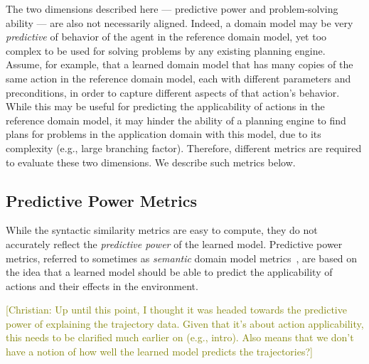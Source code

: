 \documentclass{article}
\theoremstyle{definition}
\theoremstyle{remark}
\newcommand{\roni}[1]{{\textcolor{red}{[Roni: #1]}}}
\newcommand{\cm}[1]{{\textcolor{olive}{[Christian: #1]}}}
\begin{document}
The two dimensions described here --- predictive power and problem-solving ability --- are also not necessarily aligned. Indeed, a domain model may be very \emph{predictive} of behavior of the agent in the reference domain model, yet too complex to be used for solving problems by any existing planning engine.
Assume, for example, that a learned domain model that has many copies of the same action in the reference domain model, each with different parameters and preconditions, in order to capture different aspects of that action's behavior. 
While this may be useful for predicting the applicability of actions in the reference domain model, 
it may hinder the ability of a planning engine to find plans for problems in the application domain with this model, due to its complexity (e.g., large branching factor). 
Therefore, different metrics are required to evaluate these two dimensions. We describe such metrics below. 



\subsection{Predictive Power Metrics}
\label{sec:predictiveness-metrics}
While the syntactic similarity metrics are easy to compute, they do not accurately reflect the \emph{predictive power} of the learned model. 
Predictive power metrics, referred to sometimes as \emph{semantic} domain model metrics~\citep{aineto2019learning,mordoch2024safe,le2024learning}, are based on the idea that a learned model should be able to predict the applicability of actions and their effects in the environment. 

\cm{Up until this point, I thought it was headed towards the predictive power of explaining the trajectory data. Given that it's about action applicability, this needs to be clarified much earlier on (e.g., intro). Also means that we don't have a notion of how well the learned model predicts the trajectories?}
\end{document}
